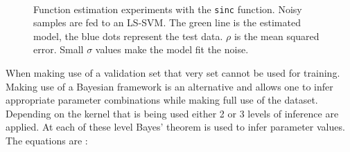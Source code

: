\begin{figure}[h]
\qquad
\\
\qquad
{}\qquad
{}\qquad
\caption{Function estimation experiments with the \texttt{sinc} function. Noisy samples are fed to an LS-SVM. The green line is the estimated model, the blue dots represent the test data. $\rho$ is the mean squared error. Small $\sigma$ values make the model fit the noise.}
\label{sincestimate}
\end{figure}

When making use of a validation set that very set cannot be used for training. Making use of a Bayesian framework is an alternative and allows one to infer appropriate parameter combinations while making full use of the dataset. Depending on the kernel that is being used either 2 or 3 levels of inference are applied. At each of these level Bayes' theorem is used to infer parameter values. The equations are : 

